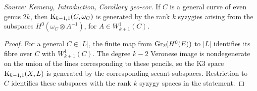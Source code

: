 \begin{corollary}
  \label{cor:kemeny_geometric_syzygy_even}
  \textit{Source: Kemeny, Introduction, Corollary geo-cor.}
  If \(C\) is a general curve of even genus \(2k\), then
  \(\mathrm{K}_{k-1,1}(C,\omega_C)\) is generated by the rank \(k\) syzygies arising
  from the subspaces \(H^0(\omega_C\otimes A^{-1})\), for
  \(A\in W^1_{k+1}(C)\).
\end{corollary}
\begin{proof}
  For a general \(C\in |L|\), the finite map from
  \(\mathrm{Gr}_2(H^0(E))\) to \(|L|\) identifies its fibre over \(C\) with
  \(W^1_{k+1}(C)\).  The degree \(k-2\) Veronese image is nondegenerate on the
  union of the lines corresponding to these pencils, so the K3 space
  \(\mathrm{K}_{k-1,1}(X,L)\) is generated by the corresponding secant subspaces.
  Restriction to \(C\) identifies these subspaces with the rank \(k\) syzygy
  spaces in the statement.
\end{proof}

